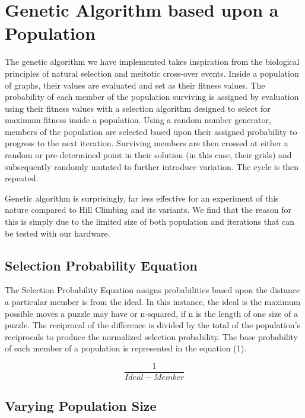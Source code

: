 \documentclass[12pt]{article}
\begin{document}
\section*{Genetic Algorithm based upon a Population}

The genetic algorithm we have implemented takes inspiration from the biological principles of natural selection and meitotic cross-over events. Inside a population of graphs, their values are evaluated and set as their fitness values. The probability of each member of the population surviving is assigned by evaluation using their fitness values with a selection algorithm designed to select for maximum fitness inside a population. Using a random number generator, members of the population are selected based upon their assigned probability to progress to the next iteration. Surviving members are then crossed at either a random or pre-determined point in their solution (in this case, their grids) and subsequently randomly mutated to further introduce variation. The cycle is then repeated. \newline

Genetic algorithm is surprisingly, far less effective for an experiment of this nature compared to Hill Climbing and its variants. We find that the reason for this is simply due to the limited size of both population and iterations that can be tested with our hardware.

\subsection*{Selection Probability Equation}
The Selection Probability Equation assigns probabilities based upon the distance a particular member is from the ideal. In this instance, the ideal is the maximum possible moves a puzzle may have or n-squared, if n is the length of one size of a puzzle. The reciprocal of the difference is divided by the total of the population's reciprocals to produce the normalized selection probability. The base probability of each member of a population is represented in the equation (1).

\begin{equation}
\frac{1}{Ideal-Member}
\end{equation}

\subsection*{Varying Population Size}
\end{document}
